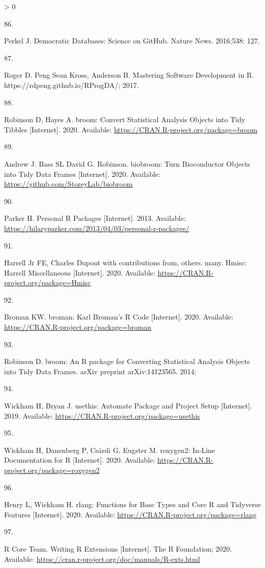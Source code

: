 \documentclass[10pt,letterpaper]{article}
\newlength{\csllabelwidth}
\newlength{\cslhangindent}
\newenvironment{CSLReferences}[3] %
 {%
  \setlength{\parindent}{0pt}
  \ifodd #1 \everypar{\setlength{\hangindent}{\cslhangindent}}\ignorespaces\fi
  \ifnum #2 > 0
  \setlength{\parskip}{#2\baselineskip}
  \fi
 }%
 {}
\newcommand{\CSLLeftMargin}[1]{\parbox[t]{\csllabelwidth}{#1}}
\newcommand{\CSLRightInline}[1]{\parbox[t]{\linewidth - \csllabelwidth}{#1}}
\begin{document}
\begin{CSLReferences}{0}{0}
\leavevmode\hypertarget{ref-perkel2016}{}%
\CSLLeftMargin{86. }
\CSLRightInline{Perkel J. {Democratic Databases: Science on GitHub}.
Nature News. 2016;538: 127. }

\leavevmode\hypertarget{ref-peng2017}{}%
\CSLLeftMargin{87. }
\CSLRightInline{Roger D. Peng Sean Kross, Anderson B. {Mastering
Software Development in R}. https://rdpeng.github.io/RProgDA/; 2017. }

\leavevmode\hypertarget{ref-broom}{}%
\CSLLeftMargin{88. }
\CSLRightInline{Robinson D, Hayes A. {broom: Convert Statistical
Analysis Objects into Tidy Tibbles} {[}Internet{]}. 2020. Available:
\url{https://CRAN.R-project.org/package=broom}}

\leavevmode\hypertarget{ref-biobroom}{}%
\CSLLeftMargin{89. }
\CSLRightInline{Andrew J. Bass SL David G. Robinson. {biobroom: Turn
Bioconductor Objects into Tidy Data Frames} {[}Internet{]}. 2020.
Available: \url{https://github.com/StoreyLab/biobroom}}

\leavevmode\hypertarget{ref-parker2013}{}%
\CSLLeftMargin{90. }
\CSLRightInline{Parker H. {Personal R Packages} {[}Internet{]}. 2013.
Available:
\url{https://hilaryparker.com/2013/04/03/personal-r-packages/}}

\leavevmode\hypertarget{ref-Hmisc}{}%
\CSLLeftMargin{91. }
\CSLRightInline{Harrell Jr FE, Charles Dupont with contributions from,
others. many. {Hmisc: Harrell Miscellaneous} {[}Internet{]}. 2020.
Available: \url{https://CRAN.R-project.org/package=Hmisc}}

\leavevmode\hypertarget{ref-broman}{}%
\CSLLeftMargin{92. }
\CSLRightInline{Broman KW. {broman: Karl Broman's R Code}
{[}Internet{]}. 2020. Available:
\url{https://CRAN.R-project.org/package=broman}}

\leavevmode\hypertarget{ref-robinson2014}{}%
\CSLLeftMargin{93. }
\CSLRightInline{Robinson D. {broom: An R package for Converting
Statistical Analysis Objects into Tidy Data Frames}. arXiv preprint
arXiv:14123565. 2014; }

\leavevmode\hypertarget{ref-usethis}{}%
\CSLLeftMargin{94. }
\CSLRightInline{Wickham H, Bryan J. {usethis: Automate Package and
Project Setup} {[}Internet{]}. 2019. Available:
\url{https://CRAN.R-project.org/package=usethis}}

\leavevmode\hypertarget{ref-roxygen2}{}%
\CSLLeftMargin{95. }
\CSLRightInline{Wickham H, Danenberg P, Csárdi G, Eugster M. {roxygen2:
In-Line Documentation for R} {[}Internet{]}. 2020. Available:
\url{https://CRAN.R-project.org/package=roxygen2}}

\leavevmode\hypertarget{ref-rlang}{}%
\CSLLeftMargin{96. }
\CSLRightInline{Henry L, Wickham H. {rlang: Functions for Base Types and
Core R and Tidyverse Features} {[}Internet{]}. 2020. Available:
\url{https://CRAN.R-project.org/package=rlang}}

\leavevmode\hypertarget{ref-Rcore2020}{}%
\CSLLeftMargin{97. }
\CSLRightInline{R Core Team. {Writing R Extensions} {[}Internet{]}. The
R Foundation; 2020. Available:
\url{https://cran.r-project.org/doc/manuals/R-exts.html}}

\end{CSLReferences}

\nolinenumbers
\end{document}
